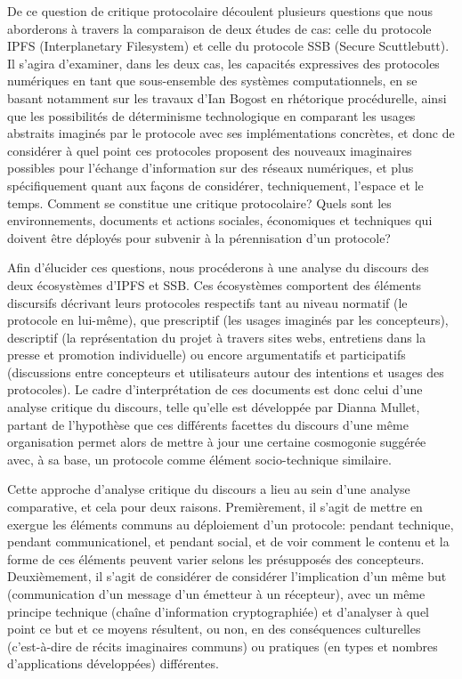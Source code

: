 \documentclass{article}
\begin{document}
De ce question de critique protocolaire découlent plusieurs questions que nous aborderons à travers la comparaison de deux études de cas: celle du protocole IPFS (Interplanetary Filesystem) et celle du protocole SSB (Secure Scuttlebutt). Il s'agira d'examiner, dans les deux cas, les capacités expressives des protocoles numériques en tant que sous-ensemble des systèmes computationnels, en se basant notamment sur les travaux d'Ian Bogost en rhétorique procédurelle\cite{bogost_persuasive_2010}, ainsi que les possibilités de déterminisme technologique en comparant les usages abstraits imaginés par le protocole avec ses implémentations concrètes, et donc de considérer à quel point ces protocoles proposent des nouveaux imaginaires possibles pour l'échange d'information sur des réseaux numériques, et plus spécifiquement quant aux façons de considérer, techniquement, l'espace et le temps. Comment se constitue une critique protocolaire? Quels sont les environnements, documents et actions sociales, économiques et techniques qui doivent être déployés pour subvenir à la pérennisation d'un protocole?

Afin d'élucider ces questions, nous procéderons à une analyse du discours des deux écosystèmes d'IPFS et SSB. Ces écosystèmes comportent des éléments discursifs décrivant leurs protocoles respectifs tant au niveau normatif (le protocole en lui-même), que prescriptif (les usages imaginés par les concepteurs), descriptif (la représentation du projet à travers sites webs, entretiens dans la presse et promotion individuelle) ou encore argumentatifs et participatifs (discussions entre concepteurs et utilisateurs autour des intentions et usages des protocoles). Le cadre d'interprétation de ces documents est donc celui d'une analyse critique du discours, telle qu'elle est développée par Dianna Mullet\cite{mullet_general_2018}, partant de l'hypothèse que ces différents facettes du discours d'une même organisation permet alors de mettre à jour une certaine cosmogonie suggérée avec, à sa base, un protocole comme élément socio-technique similaire.

Cette approche d'analyse critique du discours a lieu au sein d'une analyse comparative, et cela pour deux raisons. Premièrement, il s'agit de mettre en exergue les éléments communs au déploiement d'un protocole: pendant technique, pendant communicationel, et pendant social, et de voir comment le contenu et la forme de ces éléments peuvent varier selons les présupposés des concepteurs. Deuxièmement, il s'agit de considérer de considérer l'implication d'un même but (communication d'un message d'un émetteur à un récepteur), avec un même principe technique (chaîne d'information cryptographiée) et d'analyser à quel point ce but et ce moyens résultent, ou non, en des conséquences culturelles (c'est-à-dire de récits imaginaires communs) ou pratiques (en types et nombres d'applications développées) différentes.
\end{document}
